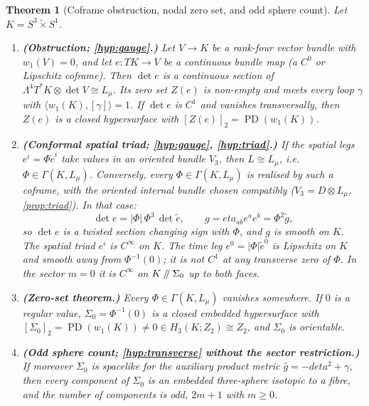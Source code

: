 \documentclass[11pt]{article}
\theoremstyle{canonmath}
\theoremstyle{canonpostulate}
\theoremstyle{canonproposition}
\theoremstyle{canonmath}
\newtheorem{mainthm}{Theorem}
\theoremstyle{canonproposition}
\providecommand{\cutK}{\Klein\mathbin{/\mkern-5mu/}\Sigma_0}
\providecommand{\Lmu}{\mathcal{L}_\mu}
\providecommand{\Vb}{\mathcal{V}}
\providecommand{\PD}{\operatorname{PD}}
\providecommand{\Klein}{\mathcal{K}}
\providecommand{\Ztwo}{\mathbb{Z}_2}
\def\mathbb#1{#1}%
\def\mathcal#1{#1}%
\def\eta{eta}%
\begin{document}
\begin{mainthm}[Coframe obstruction, nodal zero set, and odd sphere count]
\label{thm:A}
Let $\Klein = S^3\tilde{\times}S^1$.
\begin{enumerate}[label=(\alph*)]
\item \textbf{(Obstruction; \ref{hyp:gauge}.)} Let $\Vb \to \Klein$ be a rank-four vector bundle with $w_1(\Vb) = 0$, and let $e: T\Klein \to \Vb$ be a continuous bundle map (a $C^0$ or Lipschitz coframe). Then $\det e$ is a continuous section of $\Lambda^4T^*\Klein \otimes \det\Vb \cong \Lmu$. Its zero set $Z(e)$ is non-empty and meets every loop $\gamma$ with $\langle w_1(\Klein),[\gamma]\rangle = 1$. If $\det e$ is $C^1$ and vanishes transversally, then $Z(e)$ is a closed hypersurface with $[Z(e)]_2 = \PD(w_1(\Klein))$.
\item \textbf{(Conformal spatial triad; \ref{hyp:gauge}, \ref{hyp:triad}.)} If the spatial legs $e^i = \Phi\tilde{e}^i$ take values in an oriented bundle $\Vb_3$, then $L \cong \Lmu$, i.e.\ $\Phi \in \Gamma(\Klein, \Lmu)$. Conversely, every $\Phi\in\Gamma(\Klein,\Lmu)$ is realised by such a coframe, with the oriented internal bundle chosen compatibly ($\Vb_3 = D\otimes\Lmu$, \cref{prop:triad}). In that case:
\begin{equation}
\det e = |\Phi|\,\Phi^3\, \det\tilde{e}, \qquad g = \eta_{ab}e^a e^b = \Phi^2\tilde{g},
\label{eq:dete}
\end{equation}
so $\det e$ is a twisted section changing sign with $\Phi$, and $g$ is smooth on $\Klein$. The spatial triad $e^i$ is $C^\infty$ on $\Klein$. The time leg $e^0 = |\Phi|\tilde{e}^0$ is Lipschitz on $\Klein$ and smooth away from $\Phi^{-1}(0)$; it is not $C^1$ at any transverse zero of $\Phi$. In the sector $m=0$ it is $C^\infty$ on $\cutK$ up to both faces.
\item \textbf{(Zero-set theorem.)} Every $\Phi \in \Gamma(\Klein,\Lmu)$ vanishes somewhere. If $0$ is a regular value, $\Sigma_0 = \Phi^{-1}(0)$ is a closed embedded hypersurface with $[\Sigma_0]_2 = \PD(w_1(\Klein)) \neq 0 \in H_3(\Klein;\Ztwo) \cong \Ztwo$, and $\Sigma_0$ is orientable.
\item \textbf{(Odd sphere count; \ref{hyp:transverse} without the sector restriction.)} If moreover $\Sigma_0$ is spacelike for the auxiliary product metric $\hat g = -d\eta^2 + \gamma$, then every component of $\Sigma_0$ is an embedded three-sphere isotopic to a fibre, and the number of components is odd, $2m+1$ with $m \ge 0$.
\end{enumerate}
\end{mainthm}
\end{document}
